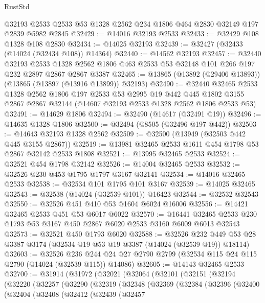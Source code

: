 \begin{lexlean}{RustStd}
\begin{coremodule}
    @32193
    @2533
    @2533
    @53
    @1328
    @2562
    @234
    @1806
    @464
    @2830
    @32149
    @197
    @2839
    @5982
    @2845
@32429 := @14016 @32193 @2533
@32433 := @32429 @108 @1328 @108 @2830
@32434 := @14025 @32193
@32439 := @32427 (@32433 (@14024 (@32434 @108)) @14364)
@32440 := @14562 @32193
@32457 := @32440
    @32193
    @2533
    @1328
    @2562
    @1806
    @463
    @2533
    @53
    @32148
    @101
    @266
    @197
    @232
    @2897
    @2867
    @2867
    @3387
@32465 := @13865 (@13892 (@29406 @13893)) (@13865 (@13897 (@13916 @13899)) @32193)
@32490 := @32440
    @32465
    @2533
    @1328
    @2562
    @1806
    @197
    @2533
    @53
    @2995
    @19
    @442
    @445
    @1802
    @3155
    @2867
    @2867
    @32144
    (@14607 @32193 @2533 @1328 @2562 @1806 @2533 @53)
@32491 := @14629 @1806
@32494 := @32490 (@14617 (@32491 @19))
@32496 := @14635 @1328 @1806
@32500 := @32494 (@8505 (@32496 @197 @442))
@32503 := @14643 @32193 @1328 @2562
@32509 := @32500 (@13949 (@32503 @442 @445 @3155 @2867))
@32519 := @13981 @32465 @2533 @1611 @454 @1798 @53 @2867 @32142 @2533 @1808
@32521 := @13995 @32465 @2533
@32524 := @32521 @454 @1798 @32142
@32526 := @14004 @32465 @2533
@32532 := @32526 @230 @453 @1795 @1797 @3167 @32141
@32534 := @14016 @32465 @2533
@32538 := @32534 @101 @1795 @101 @3167
@32539 := @14025 @32465
@32543 := @32538 (@14024 (@32539 @101)) @16423
@32544 := @32532 @32543
@32550 := @32526 @451 @410 @53 @1604 @6024 @16006
@32556 := @14421 @32465 @2533 @451 @53 @6017 @6022
@32570 := @16441 @32465 @2533 @230 @1793 @53 @3167 @450 @2867 @6020 @2533 @3160 @6009 @6013 @32543
@32573 := @32521 @450 @1793 @6020
@32588 := @32526
    @232
    @449
    @53
    @28
    @3387
    @3174
    (@32534 @19 @53 @19 @3387 (@14024 (@32539 @19)) @18114)
@32603 := @32526
    @236
    @244
    @24
    @27
    @2790
    @2799
    (@32534 @115 @24 @115 @2790 (@14024 (@32539 @115)) @14086)
@32605 := @14143 @32465 @2533
@32700 := @31914
    (@31972
      (@32021
        (@32064
          (@32101
            (@32151
              (@32194
                (@32220
                  (@32257
                    (@32290
                      (@32319
                        (@32348
                          (@32369
                            (@32384
                              (@32396
                                (@32400
                                  (@32404
                                    (@32408
                                      (@32412
                                        (@32439
                                          (@32457

\end{coremodule}
\end{lexlean}

